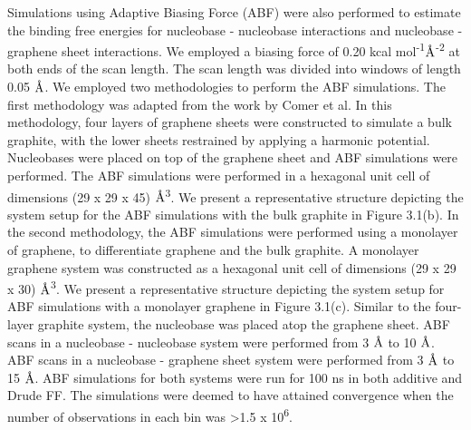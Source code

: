 Simulations using Adaptive Biasing Force (ABF) were also performed to estimate the binding free energies for nucleobase - nucleobase interactions and nucleobase - graphene sheet interactions. We employed a biasing force of 0.20 kcal mol\textsuperscript{-1}$\text{\normalfont\AA}$\textsuperscript{-2} at both ends of the scan length. The scan length was divided into windows of length 0.05 $\text{\normalfont\AA}$. We employed two methodologies to perform the ABF simulations. The first methodology was adapted from the work by Comer et al.\supercite{comer_predicting_2015,poblete_determinants_2017} In this methodology, four layers of graphene sheets were constructed to simulate a bulk graphite, with the lower sheets restrained by applying a harmonic potential. Nucleobases were placed on top of the graphene sheet and ABF simulations were performed. The ABF simulations were performed in a hexagonal unit cell of dimensions (29 x 29 x 45)  $\text{\normalfont\AA}$\textsuperscript{3}. We present a representative structure depicting the system setup for the ABF simulations with the bulk graphite in Figure 3.1(b). In the second methodology, the ABF simulations were performed using a monolayer of graphene, to differentiate graphene and the bulk graphite. A monolayer graphene system was constructed as a hexagonal unit cell of dimensions (29 x 29 x 30) $\text{\normalfont\AA}$\textsuperscript{3}. We present a representative structure depicting the system setup for ABF simulations with a monolayer graphene in Figure 3.1(c). Similar to the four-layer graphite system, the nucleobase was placed atop the graphene sheet. ABF scans in a nucleobase - nucleobase system were performed from 3 $\text{\normalfont\AA}$ to 10 $\text{\normalfont\AA}$. ABF scans in a nucleobase - graphene sheet system were performed from 3 $\text{\normalfont\AA}$ to 15 $\text{\normalfont\AA}$. ABF simulations for both systems were run for 100 ns in both additive and Drude FF. The simulations were deemed to have attained convergence when the number of observations in each bin was >1.5 x 10\textsuperscript{6}.

